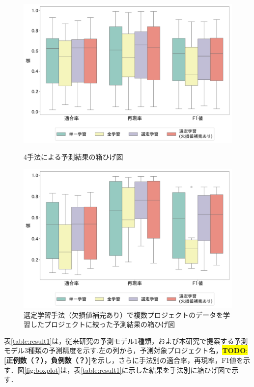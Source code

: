 \documentclass[submit]{ipsj}
\newcommand{\todo}[1]{\colorbox{yellow}{{\bf TODO}:}{\color{red} {\textbf{[#1]}}}}
\begin{document}
\begin{figure}[t]
	\centering
	\includegraphics[width=1\linewidth]{fig/boxplot_unfiltered.pdf}
	\caption{4手法による予測結果の箱ひげ図}
	\label{fig:boxplot}


	\centering
	\includegraphics[width=1\linewidth]{fig/boxplot_filtered.pdf}
	\caption{選定学習手法（欠損値補完あり）で複数プロジェクトのデータを学習したプロジェクトに絞った予測結果の箱ひげ図}
	\label{fig:boxplot_filtered}
\end{figure}

表\ref{table:result1}は，従来研究の予測モデル1種類，および本研究で提案する予測モデル3種類の予測精度を示す.左の列から，予測対象プロジェクト名，\todo{正例数（？），負例数（？）}を示し，さらに手法別の適合率，再現率，F1値を示す．図\ref{fig:boxplot}は，表\ref{table:result1}に示した結果を手法別に箱ひげ図で示す．
\end{document}
